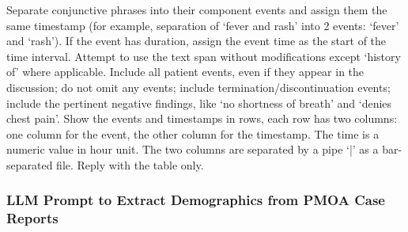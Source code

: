 \begin{tcolorbox}
Separate conjunctive phrases into their component events and assign them the same timestamp (for example, separation of ‘fever and rash’ into 2 events: ‘fever’ and ‘rash’). If the event has duration, assign the event time as the start of the time interval. Attempt to use the text span without modifications except ‘history of’ where applicable. Include all patient events, even if they appear in the discussion; do not omit any events; include termination/discontinuation events; include the pertinent negative findings, like ‘no shortness of breath’ and ‘denies chest pain’. Show the events and timestamps in rows, each row has two columns: one column for the event, the other column for the timestamp. The time is a numeric value in hour unit. The two columns are separated by a pipe ‘|’ as a bar-separated file. Reply with the table only.
\end{tcolorbox}


\subsubsection{LLM Prompt to Extract Demographics from PMOA Case Reports}
\label{ch05:apd:demographics-prompt}


